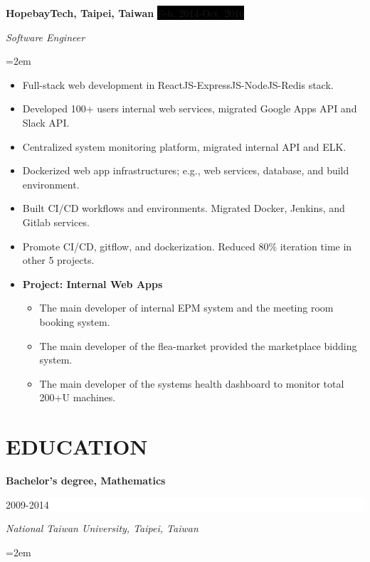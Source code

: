 \documentclass[a4paper, 11pt]{article}
\newcommand{\sepspace}{\vspace*{1em}}		%
\newcommand{\NewPart}[1]{\section*{\uppercase{#1}}}
\newcommand{\EducationEntry}[4]{
		\noindent \textbf{#1} \hfill      %
		\colorbox{White}{%
			\parbox{5cm}{%
			\hfill\color{Black}#2}} \par  %
		\noindent \textit{#3} \par        %
		\noindent\hangindent=2em\hangafter=0 \small #4 %
		\normalsize \par}
\newcommand{\WorkEntry}[4]{				  %
		\noindent \textbf{#1} \hfill      %
		\noindent\colorbox{Black}{\color{White}#2} \par  %
		\noindent \textit{#3} \par              %
		\noindent\hangindent=2em\hangafter=0 \small #4 %
		\normalsize \par}
\begin{document}
\sepspace

\WorkEntry{HopebayTech, Taipei, Taiwan}{Feb. 2014-Oct. 2016}{Software Engineer}{
\begin{itemize}
	\item {Full-stack web development in ReactJS-ExpressJS-NodeJS-Redis stack.}
	\item {Developed 100+ users internal web services, migrated Google Apps API and Slack API.}
	\item {Centralized system monitoring platform, migrated internal API and ELK.}
	\item {Dockerized web app infrastructures; e.g., web services, database, and build environment.}
	\item {Built CI/CD workflows and environments. Migrated Docker, Jenkins, and Gitlab services.}
	\item {Promote CI/CD, gitflow, and dockerization. Reduced 80\% iteration time in other 5 projects.}
	\item []{
		\textbf{Project: Internal Web Apps}
		\begin{itemize}
			\item {The main developer of internal EPM system and the meeting room booking system.}
			\item {The main developer of the flea-market provided the marketplace bidding system.}
			\item {The main developer of the systems health dashboard to monitor total 200+U machines.}
		\end{itemize}
	}
\end{itemize}
}

\NewPart{Education}{}

\EducationEntry{Bachelor's degree, Mathematics}{2009-2014}
{National Taiwan University, Taipei, Taiwan}{}


\end{document}
